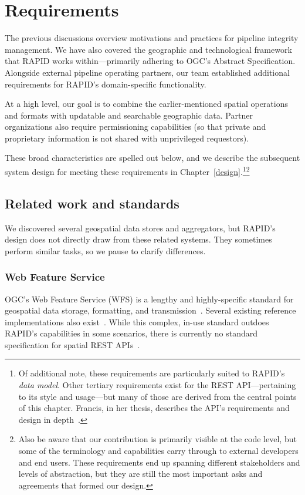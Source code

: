\chapter{Requirements}
\label{requirements}

The previous discussions overview motivations and practices for pipeline integrity management. We have also covered the geographic and technological framework that RAPID works within---primarily adhering to OGC's Abstract Specification. Alongside external pipeline operating partners, our team established additional requirements for RAPID's domain-specific functionality.

At a high level, our goal is to combine the earlier-mentioned spatial operations and formats with updatable and searchable  geographic data. Partner organizations also require permissioning capabilities (so that private and proprietary information is not shared with unprivileged requestors).

These broad characteristics are spelled out below, and we describe the subsequent system design for meeting these requirements in Chapter~\ref{design}.\footnote{Of additional note, these requirements are particularly suited to RAPID's \textit{data model}. Other tertiary requirements exist for the REST API---pertaining to its style and usage---but many of those are derived from the central points of this chapter. Francis, in her thesis, describes the API's requirements and design in depth~\cite{Francis}.}\footnote{Also be aware that our contribution is primarily visible at the code level, but some of the terminology and capabilities carry through to external developers and end users. These requirements end up spanning different stakeholders and levels of abstraction, but they are still the most important asks and agreements that formed our design.}

\section{Related work and standards}
We discovered several geospatial data stores and aggregators, but RAPID's design does not directly draw from these related systems. They sometimes perform similar tasks, so we pause to clarify differences.

\subsection{Web Feature Service}
OGC's Web Feature Service (WFS) is a lengthy and highly-specific standard for geospatial data storage, formatting, and transmission~\cite{WFS}. Several existing reference implementations also exist~\cite{RefImpl}. While this complex, in-use standard outdoes RAPID's capabilities in some scenarios, there is currently no standard specification for spatial REST APIs~\cite{WFS}.

